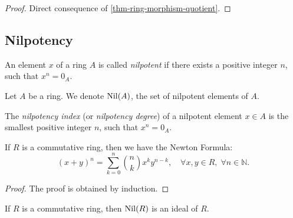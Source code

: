 \documentclass[12pt]{report}
\begin{document}
\begin{proof}
    Direct consequence of \ref{thm-ring-morphism-quotient}.
\end{proof}

\subsection{Nilpotency}

\begin{definition} \label{def-ring-nilpotent-element}
    An element $x$ of a ring $A$ is called \emph{nilpotent} if there exists a positive integer $n$, such that $x^n = 0_{A}$.
\end{definition}

\begin{definition} \label{def-ring-nilpotent-subset}
    Let $A$ be a ring. We denote $\operatorname{Nil} (A)$, the set of nilpotent elements of $A$.
\end{definition}

\begin{definition} \label{def-ring-nilpotency-index}
    The \emph{nilpotency index} (or \emph{nilpotency degree}) of a nilpotent element $x \in A$ is the smallest positive integer $n$, such that $x^n = 0_A$.
\end{definition}

\begin{lemma} \label{lem-ring-newton-formula}
    If $R$ is a commutative ring, then we have the Newton Formula:
    \[
        (x + y)^n = \sum\limits_{k = 0}^n \binom{n}{k} x^k y^{n - k}, \quad \forall x, y \in R, \; \forall n \in \mathbb{N}.
    \]
\end{lemma}

\begin{proof}
    The proof is obtained by induction.
\end{proof}

\begin{proposition} \label{prop-ring-nilpotent-ideal}
    If $R$ is a commutative ring, then $\operatorname{Nil} (R)$ is an ideal of $R$.
\end{proposition}
\end{document}
